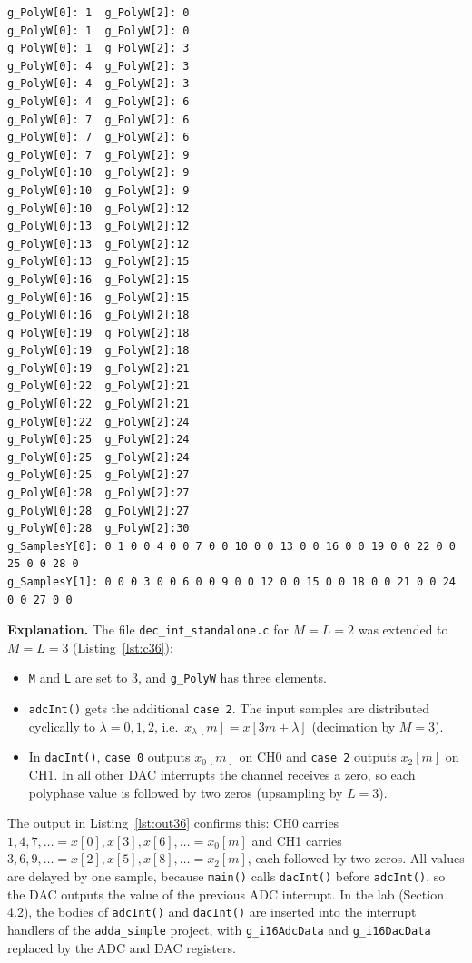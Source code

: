 \documentclass[a4paper,11pt]{article}
\begin{document}
	\begin{lstlisting}[style=ccode, numbers=none, basicstyle=\ttfamily\tiny, columns=fixed, breaklines=false, caption={Simulated output of \texttt{adcInt()}/\texttt{dacInt()} for the input values 1 to 30 and both interrupt orders, Section 3.6}, label={lst:out36}]
g_PolyW[0]: 1  g_PolyW[2]: 0
g_PolyW[0]: 1  g_PolyW[2]: 0
g_PolyW[0]: 1  g_PolyW[2]: 3
g_PolyW[0]: 4  g_PolyW[2]: 3
g_PolyW[0]: 4  g_PolyW[2]: 3
g_PolyW[0]: 4  g_PolyW[2]: 6
g_PolyW[0]: 7  g_PolyW[2]: 6
g_PolyW[0]: 7  g_PolyW[2]: 6
g_PolyW[0]: 7  g_PolyW[2]: 9
g_PolyW[0]:10  g_PolyW[2]: 9
g_PolyW[0]:10  g_PolyW[2]: 9
g_PolyW[0]:10  g_PolyW[2]:12
g_PolyW[0]:13  g_PolyW[2]:12
g_PolyW[0]:13  g_PolyW[2]:12
g_PolyW[0]:13  g_PolyW[2]:15
g_PolyW[0]:16  g_PolyW[2]:15
g_PolyW[0]:16  g_PolyW[2]:15
g_PolyW[0]:16  g_PolyW[2]:18
g_PolyW[0]:19  g_PolyW[2]:18
g_PolyW[0]:19  g_PolyW[2]:18
g_PolyW[0]:19  g_PolyW[2]:21
g_PolyW[0]:22  g_PolyW[2]:21
g_PolyW[0]:22  g_PolyW[2]:21
g_PolyW[0]:22  g_PolyW[2]:24
g_PolyW[0]:25  g_PolyW[2]:24
g_PolyW[0]:25  g_PolyW[2]:24
g_PolyW[0]:25  g_PolyW[2]:27
g_PolyW[0]:28  g_PolyW[2]:27
g_PolyW[0]:28  g_PolyW[2]:27
g_PolyW[0]:28  g_PolyW[2]:30
g_SamplesY[0]: 0 1 0 0 4 0 0 7 0 0 10 0 0 13 0 0 16 0 0 19 0 0 22 0 0 25 0 0 28 0 
g_SamplesY[1]: 0 0 0 3 0 0 6 0 0 9 0 0 12 0 0 15 0 0 18 0 0 21 0 0 24 0 0 27 0 0 
	\end{lstlisting}
	
\noindent\textbf{Explanation.} The file \texttt{dec\_int\_standalone.c} for $M = L = 2$ was extended to $M = L = 3$ (Listing~\ref{lst:c36}):
\begin{itemize}
\item \texttt{M} and \texttt{L} are set to 3, and \texttt{g\_PolyW} has three elements.
\item \texttt{adcInt()} gets the additional \texttt{case 2}. The input samples are distributed cyclically to $\lambda = 0, 1, 2$, i.e.\ $x_\lambda[m] = x[3m + \lambda]$ (decimation by $M = 3$).
\item In \texttt{dacInt()}, \texttt{case 0} outputs $x_0[m]$ on CH0 and \texttt{case 2} outputs $x_2[m]$ on CH1. In all other DAC interrupts the channel receives a zero, so each polyphase value is followed by two zeros (upsampling by $L = 3$).
\end{itemize}
The output in Listing~\ref{lst:out36} confirms this: CH0 carries $1, 4, 7, \dots = x[0], x[3], x[6], \dots = x_0[m]$ and CH1 carries $3, 6, 9, \dots = x[2], x[5], x[8], \dots = x_2[m]$, each followed by two zeros. All values are delayed by one sample, because \texttt{main()} calls \texttt{dacInt()} before \texttt{adcInt()}, so the DAC outputs the value of the previous ADC interrupt. In the lab (Section 4.2), the bodies of \texttt{adcInt()} and \texttt{dacInt()} are inserted into the interrupt handlers of the \texttt{adda\_simple} project, with \texttt{g\_i16AdcData} and \texttt{g\_i16DacData} replaced by the ADC and DAC registers.
\end{document}
